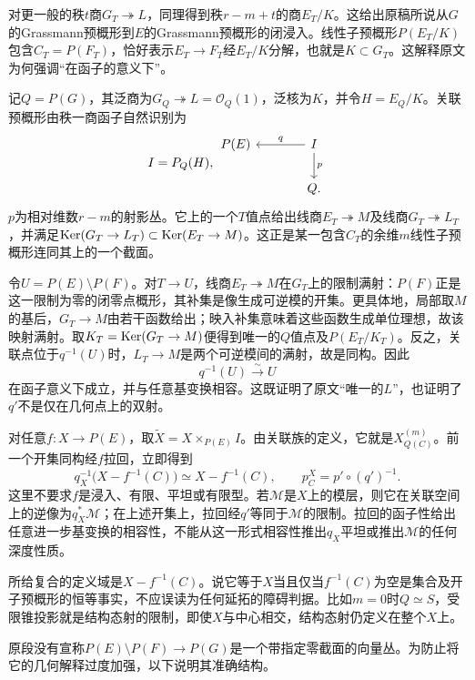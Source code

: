 对更一般的秩$t$商$G_T\twoheadrightarrow L$，同理得到秩$r-m+t$的商$E_T/K$。这给出原稿所说从$G$的Grassmann预概形到$E$的Grassmann预概形的闭浸入。线性子预概形$P(E_T/K)$包含$C_T=P(F_T)$，恰好表示$E_T\to F_T$经$E_T/K$分解，也就是$K\subset G_T$。这解释原文为何强调“在函子的意义下”。

记$Q=P(G)$，其泛商为$G_Q\twoheadrightarrow L=\mathscr O_Q(1)$，泛核为$K$，并令$H=E_Q/K$。关联预概形由秩一商函子自然识别为
\[
I=P_Q(H),\qquad
\begin{tikzcd}[column sep=large]
P(E) & I\arrow[l,"q"']\arrow[d,"p"]\\
     & Q.
\end{tikzcd}
\]
$p$为相对维数$r-m$的射影丛。它上的一个$T$值点给出线商$E_T\twoheadrightarrow M$及线商$G_T\twoheadrightarrow L_T$，并满足$\operatorname{Ker}(G_T\to L_T)\subset\operatorname{Ker}(E_T\to M)$。这正是某一包含$C_T$的余维$m$线性子预概形连同其上的一个截面。

令$U=P(E)\setminus P(F)$。对$T\to U$，线商$E_T\twoheadrightarrow M$在$G_T$上的限制满射：$P(F)$正是这一限制为零的闭零点概形，其补集是像生成可逆模的开集。更具体地，局部取$M$的基后，$G_T\to M$由若干函数给出；映入补集意味着这些函数生成单位理想，故该映射满射。取$K_T=\operatorname{Ker}(G_T\to M)$便得到唯一的$Q$值点及$P(E_T/K_T)$。反之，关联点位于$q^{-1}(U)$时，$L_T\to M$是两个可逆模间的满射，故是同构。因此
\[
q^{-1}(U)\xrightarrow{\sim}U
\]
在函子意义下成立，并与任意基变换相容。这既证明了原文“唯一的$L$”，也证明了$q'$不是仅在几何点上的双射。

对任意$f:X\to P(E)$，取$\widetilde X=X\times_{P(E)}I$。由关联族的定义，它就是$X^{(m)}_{Q(C)}$。前一个开集同构经$f$拉回，立即得到
\[
q_X^{-1}\bigl(X-f^{-1}(C)\bigr)
 \simeq X-f^{-1}(C),
\qquad
p_C^X=p'\circ(q')^{-1}.
\]
这里不要求$f$是浸入、有限、平坦或有限型。若$\mathcal M$是$X$上的模层，则它在关联空间上的逆像为$q_X^*\mathcal M$；在上述开集上，拉回经$q'$等同于$\mathcal M$的限制。拉回的函子性给出任意进一步基变换的相容性，不能从这一形式相容性推出$q_X$平坦或推出$\mathcal M$的任何深度性质。

所给复合的定义域是$X-f^{-1}(C)$。说它等于$X$当且仅当$f^{-1}(C)$为空是集合及开子预概形的恒等事实，不应误读为任何延拓的障碍判据。比如$m=0$时$Q\simeq S$，受限锥投影就是结构态射的限制，即使$X$与中心相交，结构态射仍定义在整个$X$上。

原段没有宣称$P(E)\setminus P(F)\to P(G)$是一个带指定零截面的向量丛。为防止将它的几何解释过度加强，以下说明其准确结构。

